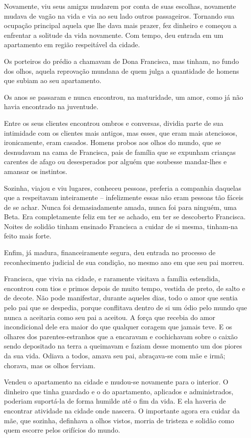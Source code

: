 \documentclass[11pt,a4paper,twoside,openany]{book}
\begin{document}
Novamente, viu seus amigxs mudarem por conta de suas escolhas, novamente mudava de vagão na vida e via ao seu lado outros passageiros. Tornando sua ocupação principal aquela que lhe dava mais prazer, fez dinheiro e começou a enfrentar a solitude da vida novamente. Com tempo, deu entrada em um apartamento em região respeitável da cidade. 

Os porteiros do prédio a chamavam de Dona Francisca, mas tinham, no fundo dos olhos, aquela reprovação mundana de quem julga a quantidade de homens que subiam ao seu apartamento. 

Os anos se passaram e nunca encontrou, na maturidade, um amor, como já não havia encontrado na juventude. 

Entre os seus clientes encontrou ombros e conversas, dividia parte de sua intimidade com os clientes mais antigos, mas esses, que eram mais atenciosos, ironicamente, eram casados. Homens probos aos olhos do mundo, que se desnudavam na cama de Francisca, pais de família que se expunham crianças carentes de afago ou desesperados por alguém que soubesse mandar-lhes e amansar os instintos.

Sozinha, viajou e viu lugares, conheceu pessoas, preferia a companhia daquelas que a respeitavam inteiramente – infelizmente essas não eram pessoas tão fáceis de se achar. Nunca foi demasiadamente amada, nunca foi para ninguém, uma Beta. Era completamente feliz em ter se achado, em ter se descoberto Francisca. Noites de solidão tinham ensinado Francisca a cuidar de si mesma, tinham-na feito mais forte.

Enfim, já madura, financeiramente segura, deu entrada no processo de reconhecimento judicial de sua condição, no mesmo ano em que seu pai morreu. 

Francisca, que vivia na cidade, e raramente visitava a família estendida, encontrou com tios e primos depois de muito tempo, vestida de preto, de salto e de decote. Não pode manifestar, durante aqueles dias, todo o amor que sentia pelo pai que se despedia, porque conflitava dentro de si um ódio pelo mundo que nunca a aceitaria como seu pai a aceitou. A força que recebia do amor incondicional dele era maior do que qualquer coragem que jamais teve. E os olhares dos parentes-estranhos que a encaravam e cochichavam sobre o caixão sendo depositado na terra a queimavam e faziam desse momento um dos piores da sua vida. Odiava a todos, amava seu pai, abraçava-se com mãe e irmã; chorava, mas os olhos ferviam.

Vendeu o apartamento na cidade e mudou-se novamente para o interior. O dinheiro que tinha guardado e o do apartamento, aplicados e administrados, poderiam suportá-la de forma humilde até o fim da vida. E ela haveria de encontrar atividade na cidade onde nascera. O importante agora era cuidar da mãe, que sozinha, definhava a olhos vistos, morria de tristeza e solidão como quem escorre pelos orifícios do mundo. 
\end{document}
